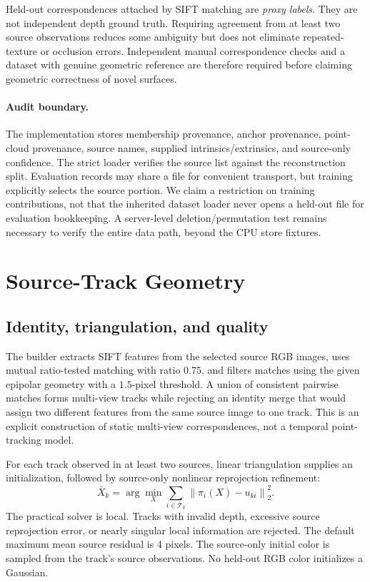 \documentclass[10pt,twocolumn,letterpaper]{article}
\newcommand{\norm}[1]{\left\lVert#1\right\rVert}
\newcommand{\cT}{\mathcal{T}}
\begin{document}
Held-out correspondences attached by SIFT matching are \emph{proxy labels}. They are not independent depth ground truth. Requiring agreement from at least two source observations reduces some ambiguity but does not eliminate repeated-texture or occlusion errors. Independent manual correspondence checks and a dataset with genuine geometric reference are therefore required before claiming geometric correctness of novel surfaces.

\paragraph{Audit boundary.} The implementation stores membership provenance, anchor provenance, point-cloud provenance, source names, supplied intrinsics/extrinsics, and source-only confidence. The strict loader verifies the source list against the reconstruction split. Evaluation records may share a file for convenient transport, but training explicitly selects the source portion. We claim a restriction on training contributions, not that the inherited dataset loader never opens a held-out file for evaluation bookkeeping. A server-level deletion/permutation test remains necessary to verify the entire data path, beyond the CPU store fixtures.

\section{Source-Track Geometry}
\subsection{Identity, triangulation, and quality}
The builder extracts SIFT features from the selected source RGB images, uses mutual ratio-tested matching with ratio $0.75$, and filters matches using the given epipolar geometry with a $1.5$-pixel threshold. A union of consistent pairwise matches forms multi-view tracks while rejecting an identity merge that would assign two different features from the same source image to one track. This is an explicit construction of static multi-view correspondences, not a temporal point-tracking model.

For each track observed in at least two sources, linear triangulation supplies an initialization, followed by source-only nonlinear reprojection refinement:
\begin{equation}
\bar X_k=\arg\min_X\sum_{i\in\cT_k}\norm{\pi_i(X)-u_{ki}}_2^2.
\label{eq:triangulation}
\end{equation}
The practical solver is local. Tracks with invalid depth, excessive source reprojection error, or nearly singular local information are rejected. The default maximum mean source residual is $4$ pixels. The source-only initial color is sampled from the track's source observations. No held-out RGB color initializes a Gaussian.
\end{document}

